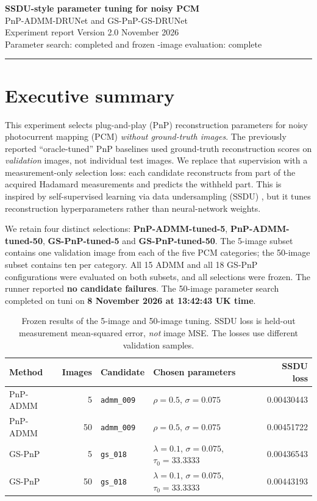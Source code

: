 \documentclass[a4paper,10pt]{article}
\begin{document}
\vspace*{0.25em}
{\LARGE\bfseries\color{main} SSDU-style parameter tuning for noisy PCM}\\[4pt]
{\large PnP-ADMM-DRUNet and GS-PnP-GS-DRUNet}\\[6pt]
{\color{muted} Experiment report \quad Version 2.0  November 2026}\\[2pt]
{\color{muted} Parameter search: completed and frozen -image evaluation: complete}
\vspace{0.2cm}\hrule

\section{Executive summary}

This experiment selects plug-and-play (PnP) reconstruction parameters for noisy photocurrent mapping (PCM) \emph{without ground-truth images}. The previously reported ``oracle-tuned'' PnP baselines used ground-truth reconstruction scores on \emph{validation} images, not individual test images. We replace that supervision with a measurement-only selection loss: each candidate reconstructs from part of the acquired Hadamard measurements and predicts the withheld part. This is inspired by self-supervised learning via data undersampling (SSDU) \cite{yaman2020}, but it tunes reconstruction hyperparameters rather than neural-network weights.

We retain four distinct selections: \textbf{PnP-ADMM-tuned-5}, \textbf{PnP-ADMM-tuned-50}, \textbf{GS-PnP-tuned-5} and \textbf{GS-PnP-tuned-50}. The 5-image subset contains one validation image from each of the five PCM categories; the 50-image subset contains ten per category. All 15 ADMM and all 18 GS-PnP configurations were evaluated on both subsets, and all selections were frozen. The runner reported \textbf{no candidate failures}. The 50-image parameter search completed on tuni on \textbf{8 November 2026 at 13:42:43 UK time}.

\begin{table}[H]
\centering\small
\begin{tabularx}{\linewidth}{@{}lrlXr@{}}
\toprule
\textbf{Method} & \textbf{Images} & \textbf{Candidate} & \textbf{Chosen parameters} & \textbf{SSDU loss} \\
\midrule
PnP-ADMM & 5 & \texttt{admm\_009} & $\rho=0.5$, $\sigma=0.075$ & 0.00430443 \\
PnP-ADMM & 50 & \texttt{admm\_009} & $\rho=0.5$, $\sigma=0.075$ & 0.00451722 \\
GS-PnP & 5 & \texttt{gs\_018} & $\lambda=0.1$, $\sigma=0.075$, $\tau_0=33.3333$ & 0.00436543 \\
GS-PnP & 50 & \texttt{gs\_018} & $\lambda=0.1$, $\sigma=0.075$, $\tau_0=33.3333$ & 0.00443193 \\
\bottomrule
\end{tabularx}
\caption{Frozen results of the 5-image and 50-image tuning. SSDU loss is held-out measurement mean-squared error, \emph{not} image MSE. The losses use different validation samples.}
\label{tab:winners}
\end{table}
\end{document}
